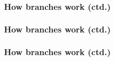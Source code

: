 \documentclass[12pt]{beamer}
\begin{document}
\begin{frame}
  \frametitle{How branches work (ctd.)}

\end{frame}

\begin{frame}
  \frametitle{How branches work (ctd.)}

\end{frame}

\begin{frame}
  \frametitle{How branches work (ctd.)}

\end{frame}
\end{document}
